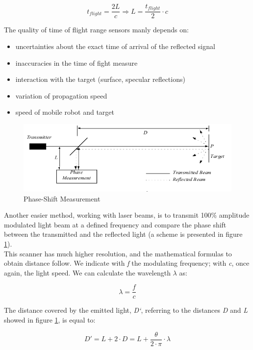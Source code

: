 \[
t_{flight} = \frac{2L}{c}  \Longrightarrow  L = \frac{t_{flight}}{2}\cdot c
\]

The quality of time of flight range sensors manly depends on:

\begin{itemize}
\item uncertainties about the exact time of arrival of the reflected signal
\item inaccuracies in the time of fight measure
\item interaction with the target (surface, specular reflections)
\item variation of propagation speed
\item speed of mobile robot and target
\end{itemize}

\begin{figure} [h]
  \begin{center}
    \includegraphics[width=\textwidth]{img/laser_shift_phase.png}
    \caption{Phase-Shift Measurement}
    \label{fig:laser_shift_phase}
  \end{center}
\end{figure}

Another easier method, working with laser beams, is to transmit 100\%
amplitude modulated light beam at a defined frequency and compare
the phase shift between the transmitted and the reflected light (a scheme
is presented in figure \ref{fig:laser_shift_phase}).
\\
This scanner has much higher resolution, and the mathematical formulas to
obtain distance follow. We indicate with \textit{f} the modulating
frequency; with \textit{c}, once again, the light speed. We can calculate
the wavelength \textit{$\lambda$} as:

\[
\lambda = \frac{f}{c}
\]

The distance covered by the emitted light, \textit{D`}, referring to
the distances \textit{D} and \textit{L} showed in figure
\ref{fig:laser_shift_phase}, is equal to:

\[
D' = L + 2 \cdot D = L + \frac{\theta}{2\cdot\pi}\cdot\lambda
\]

